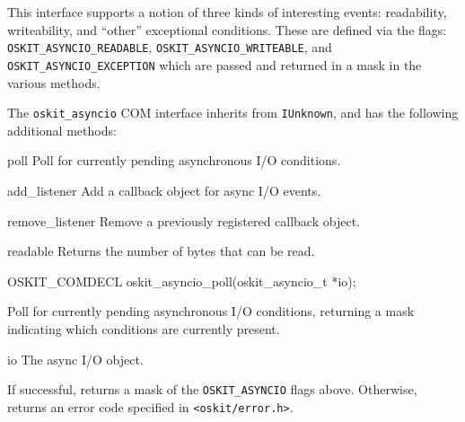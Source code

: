 This interface supports a notion of three kinds of interesting events:
readability, writeability, and ``other'' exceptional conditions.
These are defined via the flags:
\texttt{OSKIT_ASYNCIO_READABLE},
\texttt{OSKIT_ASYNCIO_WRITEABLE},
and \texttt{OSKIT_ASYNCIO_EXCEPTION}
which are passed and returned in a mask in the various methods. 

The {\tt oskit_asyncio} COM interface inherits from {\tt IUnknown},
and has the following additional methods:	
\begin{icsymlist}
\item[poll]
	Poll for currently pending asynchronous I/O conditions.
\item[add_listener]
	Add a callback object for async I/O events.
\item[remove_listener]
	Remove a previously registered callback object.
\item[readable]
	Returns the number of bytes that can be read. 
\end{icsymlist}

\begin{apisyn}

	\funcproto OSKIT_COMDECL
	oskit_asyncio_poll(oskit_asyncio_t *io);
\end{apisyn}
\begin{apidesc}
	Poll for currently pending asynchronous I/O conditions,
	returning a mask indicating which conditions are currently present.
\end{apidesc}
\begin{apiparm}
	\item[io]
		The async I/O object.
\end{apiparm}
\begin{apiret}
	If successful, returns a mask of the \texttt{OSKIT_ASYNCIO} flags above.
	Otherwise, returns an error code specified in
	{\tt <oskit/error.h>}.
\end{apiret}

